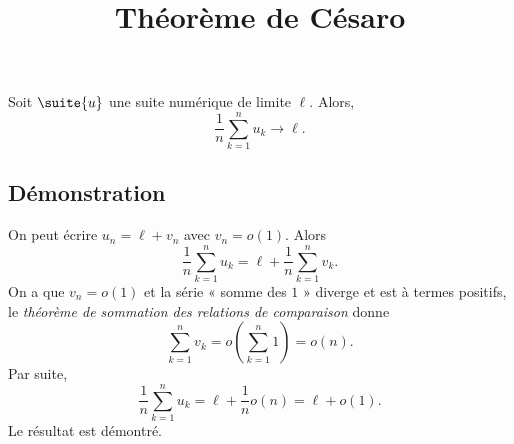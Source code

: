 \documentclass[fontsize=12pt,twoside=false,parskip=half, french]{scrartcl}
\title{Théorème de Césaro}
\date{}
\author{}
\begin{document}
\maketitle
   \begin{Theoreme}
      Soit $\suite{u}$ une suite numérique de limite $\ell$. Alors,
      \[
         \frac{1}{n}\sum_{k = 1}^n u_k \to \ell.
      \]
   \end{Theoreme}
   \subsection{Démonstration}
      On peut écrire $u_n = \ell + v_n$ avec $v_n = o(1)$. Alors
      \[
        \frac{1}{n}\sum_{k = 1}^n u_k = \ell + \frac{1}{n}\sum_{k = 1}^n v_k. 
      \]
      On a que $v_n = o(1)$ et la série « somme des $1$ » diverge et est à termes positifs, le \emph{théorème de sommation 
      des relations de comparaison} donne
      \[
         \sum_{k = 1}^n v_k = o\left(\sum_{k = 1}^n 1\right) = o(n).
      \]
      Par suite,
      \[
         \frac{1}{n}\sum_{k = 1}^n u_k = \ell + \frac{1}{n} o(n) = \ell + o(1).
      \]
      Le résultat est démontré.
\end{document}
